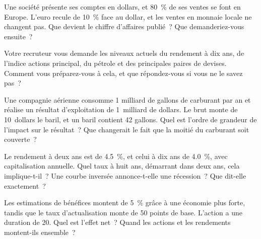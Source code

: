 \begin{question}\label{iq:iv2:macro-market-knowledge-and-pitches:5}
Une société présente ses comptes en dollars, et 80~\% de ses ventes se font en Europe. L'euro recule de 10~\% face au dollar, et les ventes en monnaie locale ne changent pas. Que devient le chiffre d'affaires publié~? Que demanderiez-vous ensuite~?
\end{question}

\begin{question}\label{iq:iv2:macro-market-knowledge-and-pitches:6}
Votre recruteur vous demande les niveaux actuels du rendement à dix ans, de l'indice actions principal, du pétrole et des principales paires de devises. Comment vous préparez-vous à cela, et que répondez-vous si vous ne le savez pas~?
\end{question}

\begin{question}\label{iq:iv2:macro-market-knowledge-and-pitches:7}
Une compagnie aérienne consomme 1 milliard de gallons de carburant par an et réalise un résultat d'exploitation de 1~milliard de dollars. Le brut monte de 10~dollars le baril, et un baril contient 42 gallons. Quel est l'ordre de grandeur de l'impact sur le résultat~? Que changerait le fait que la moitié du carburant soit couverte~?
\end{question}

\begin{question}\label{iq:iv2:macro-market-knowledge-and-pitches:8}
Le rendement à deux ans est de 4.5~\%, et celui à dix ans de 4.0~\%, avec capitalisation annuelle. Quel taux à huit ans, démarrant dans deux ans, cela implique-t-il~? Une courbe inversée annonce-t-elle une récession~? Que dit-elle exactement~?
\end{question}

\begin{question}\label{iq:iv2:macro-market-knowledge-and-pitches:9}
Les estimations de bénéfices montent de 5~\% grâce à une économie plus forte, tandis que le taux d'actualisation monte de 50 points de base. L'action a une duration de 20. Quel est l'effet net~? Quand les actions et les rendements montent-ils ensemble~?
\end{question}

